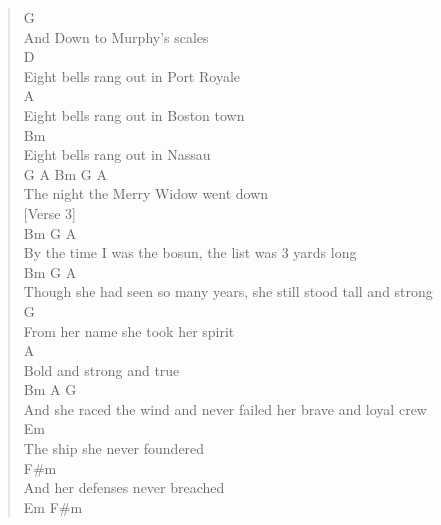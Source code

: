 \documentclass[11pt]{article}
\begin{document}
\begin{verse}
\hspace*{5em}G\\
And Down to Murphy's scales\\
\hspace*{7em}D\\
Eight bells rang out in Port Royale\\
\hspace*{7em}A\\
Eight bells rang out in Boston town\\
\hspace*{7em}Bm\\
Eight bells rang out in Nassau\\
\hspace*{5em}G               A          Bm      G   A\\
The night the Merry Widow went down\\
\vspace*{1em}
\vspace*{1em}
[Verse 3]\\
\vspace*{1em}
\hspace*{7em}Bm                        G                A\\
By the time I was the bosun, the list was 3 yards long\\
\hspace*{7em}Bm                              G                    A\\
Though she had seen so many years, she still stood tall and strong\\
\hspace*{9em}G\\
From her name she took her spirit\\
A\\
Bold and strong and true\\
\hspace*{8em}Bm                 A                G\\
And she raced the wind and never failed her brave and loyal crew\\
\vspace*{1em}
\hspace*{4em}Em\\
The ship she never foundered\\
\hspace*{10em}F\#m\\
And her defenses never breached\\
\hspace*{3em}Em                          F\#m\\

\end{verse}
\end{document}

